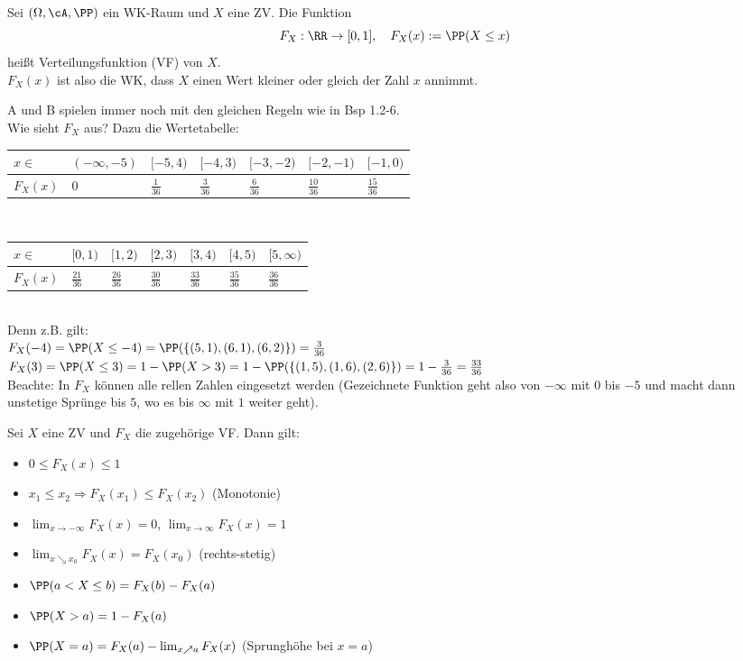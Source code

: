 \documentclass{scrreprt}
\begin{document}
 Sei $(\Omega, \cA, \PP)$ ein WK-Raum und $X$ eine ZV. Die Funktion
$$F_X: \RR\to [0,1], \quad F_X(x):=\PP(X \leq x)$$
heißt Verteilungsfunktion (VF) von $X$.\\
$F_X(x)$ ist also die WK, dass $X$ einen Wert kleiner oder gleich der Zahl $x$ annimmt.

 A und B spielen immer noch mit den gleichen Regeln wie in Bsp 1.2-6.\\
Wie sieht $F_X$ aus? Dazu die Wertetabelle:\\
\begin{tabular}{L{0.13}|L{0.13}|L{0.13}|L{0.13}|L{0.13}|L{0.13}|L{0.13}}
$x\in$ & $(-\infty,-5)$ & $[-5,4)$ & $[-4,3)$& $[-3,-2)$ & $[-2,-1)$ & $[-1,0)$\\
\hline
$F_X(x)$ & $0$ & $\tfrac{1}{36}$ & $\tfrac{3}{36}$ & $\tfrac{6}{36}$ & $\tfrac{10}{36}$ & $\tfrac{15}{36}$ 
\end{tabular}\smallskip\\
\begin{tabular}{L{0.13}|L{0.13}|L{0.13}|L{0.13}|L{0.13}|L{0.13}|L{0.13}}
$x\in$ & $[0,1)$ & $[1,2)$ & $[2,3)$ & $[3,4)$ & $[4,5)$ & $[5,\infty)$\\
\hline
$F_X(x)$ & $\tfrac{21}{36}$ & $\tfrac{26}{36}$ & $\tfrac{30}{36}$ & $\tfrac{33}{36}$ & $\tfrac{35}{36}$ & $\tfrac{36}{36}$
\end{tabular}\smallskip\\
Denn z.B. gilt:\\
$F_X(-4) = \PP(X \leq -4) = \PP(\{(5,1),(6,1), (6,2)\}) = \frac{3}{36}$\\
$F_X(3) = \PP(X \leq 3 ) = 1- \PP(X>3) = 1 - \PP(\{(1,5),(1,6),(2,6)\})=1-\frac{3}{36}=\frac{33}{36}$\\
Beachte: In $F_X$ können alle rellen Zahlen eingesetzt werden (Gezeichnete Funktion geht also von $-\infty$ mit $0$ bis $-5$ und macht dann unstetige Sprünge bis $5$, wo es bis $\infty$ mit $1$ weiter geht).

 Sei $X$ eine ZV und $F_X$ die zugehörige VF. Dann gilt:
\begin{itemize}
\item $0\leq F_X (x) \leq 1$
\item $x_1 \leq x_2 \Rightarrow F_X(x_1) \leq F_X(x_2)$ \tab(Monotonie)
\item $\lim_{x\to -\infty} F_X(x) =0$, $\lim_{x\to\infty} F_X(x) = 1$
\item $\lim_{x \searrow x_0} F_X(x)=F_X(x_0)$ \tab\tab(rechts-stetig)
\item $\PP(a <X\leq b)=F_X(b)-F_X(a)$
\item $\PP(X>a) = 1 - F_X(a)$
\item $\PP(X=a)=F_X(a)-\lim_{x\nearrow a}F_X(x)$ \tab (Sprunghöhe bei $x=a$)
\end{itemize}
\end{document}
